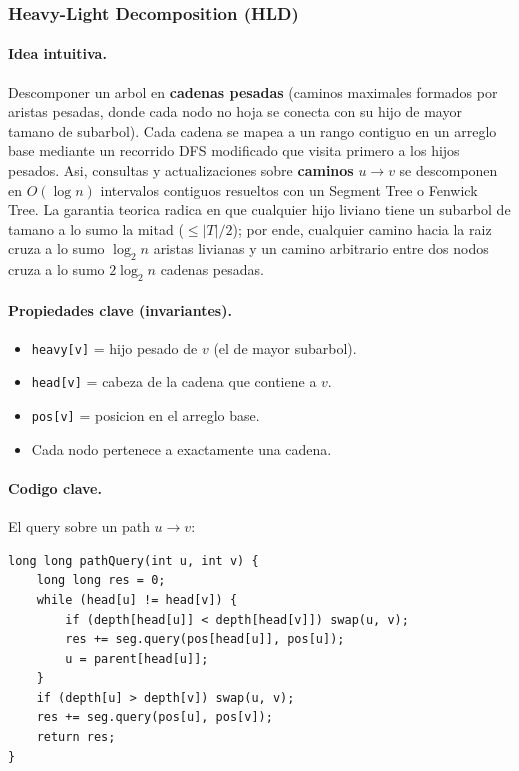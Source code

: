 \subsubsection{Heavy-Light Decomposition (HLD)}

\paragraph{Idea intuitiva.}
Descomponer un arbol en \textbf{cadenas pesadas} (caminos maximales formados por aristas pesadas, donde cada nodo no hoja se conecta con su hijo de mayor tamano de subarbol). Cada cadena se mapea a un rango contiguo en un arreglo base mediante un recorrido DFS modificado que visita primero a los hijos pesados. Asi, consultas y actualizaciones sobre \textbf{caminos} $u \to v$ se descomponen en $O(\log n)$ intervalos contiguos resueltos con un Segment Tree o Fenwick Tree. La garantia teorica radica en que cualquier hijo liviano tiene un subarbol de tamano a lo sumo la mitad ($\le |T|/2$); por ende, cualquier camino hacia la raiz cruza a lo sumo $\log_2 n$ aristas livianas y un camino arbitrario entre dos nodos cruza a lo sumo $2 \log_2 n$ cadenas pesadas.

\paragraph{Propiedades clave (invariantes).}
\begin{itemize}\setlength\itemsep{0pt}
	\item \texttt{heavy[v]} = hijo pesado de $v$ (el de mayor subarbol).
	\item \texttt{head[v]} = cabeza de la cadena que contiene a $v$.
	\item \texttt{pos[v]} = posicion en el arreglo base.
	\item Cada nodo pertenece a exactamente una cadena.
\end{itemize}

\paragraph{Codigo clave.}
El query sobre un path $u \to v$:
\begin{verbatim}
long long pathQuery(int u, int v) {
    long long res = 0;
    while (head[u] != head[v]) {
        if (depth[head[u]] < depth[head[v]]) swap(u, v);
        res += seg.query(pos[head[u]], pos[u]);
        u = parent[head[u]];
    }
    if (depth[u] > depth[v]) swap(u, v);
    res += seg.query(pos[u], pos[v]);
    return res;
}
\end{verbatim}

